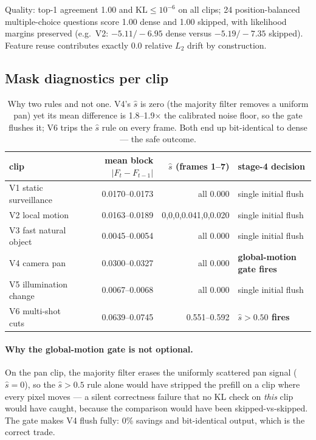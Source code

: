\documentclass[11pt]{article}
\begin{document}
Quality: top-1 agreement 1.00 and $\mathrm{KL}\le10^{-6}$ on all clips; 24
position-balanced multiple-choice questions score 1.00 dense and 1.00 skipped, with
likelihood margins preserved (e.g.\ V2: $-5.11/-6.95$ dense versus $-5.19/-7.35$ skipped).
Feature reuse contributes exactly 0.0 relative $L_2$ drift by construction.

\subsection{Mask diagnostics per clip}
\begin{table}[h]\centering\small
\setlength{\tabcolsep}{4pt}
\begin{tabular}{lrrl}
\toprule
clip & mean block $|F_t-F_{t-1}|$ & $\hat s$ (frames 1--7) & stage-4 decision \\
\midrule
V1 static surveillance & 0.0170--0.0173 & all 0.000 & single initial flush \\
V2 local motion        & 0.0163--0.0189 & 0,0,0,0.041,0,0.020 & single initial flush \\
V3 fast natural object & 0.0045--0.0054 & all 0.000 & single initial flush \\
V4 camera pan          & 0.0300--0.0327 & all 0.000 & \textbf{global-motion gate fires} \\
V5 illumination change & 0.0067--0.0068 & all 0.000 & single initial flush \\
V6 multi-shot cuts     & 0.0639--0.0745 & 0.551--0.592 & \textbf{$\hat s>0.50$ fires} \\
\bottomrule
\end{tabular}
\caption{Why two rules and not one. V4's $\hat s$ is zero (the majority filter removes a
uniform pan) yet its mean difference is 1.8--1.9$\times$ the calibrated noise floor, so the
gate flushes it; V6 trips the $\hat s$ rule on every frame. Both end up bit-identical to
dense --- the safe outcome.}
\end{table}


\paragraph{Why the global-motion gate is not optional.} On the pan clip, the majority
filter erases the uniformly scattered pan signal ($\hat s = 0$), so the $\hat s>0.5$ rule
alone would have stripped the prefill on a clip where every pixel moves --- a silent
correctness failure that no KL check on \emph{this} clip would have caught, because the
comparison would have been skipped-vs-skipped. The gate makes V4 flush fully: 0\% savings
and bit-identical output, which is the correct trade.
\end{document}
